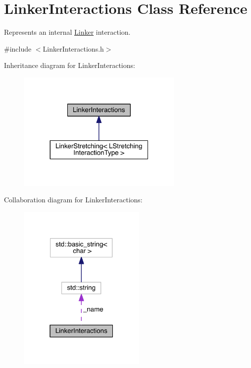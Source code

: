 \hypertarget{classLinkerInteractions}{\section{Linker\+Interactions Class Reference}
\label{classLinkerInteractions}
}


Represents an internal \hyperlink{classLinker}{Linker} interaction.  




{\ttfamily \#include $<$Linker\+Interactions.\+h$>$}



Inheritance diagram for Linker\+Interactions\+:
\nopagebreak
\begin{figure}[H]
\begin{center}
\leavevmode
\includegraphics[width=227pt]{classLinkerInteractions__inherit__graph}
\end{center}
\end{figure}


Collaboration diagram for Linker\+Interactions\+:\nopagebreak
\begin{figure}[H]
\begin{center}
\leavevmode
\includegraphics[width=175pt]{classLinkerInteractions__coll__graph}
\end{center}
\end{figure}
